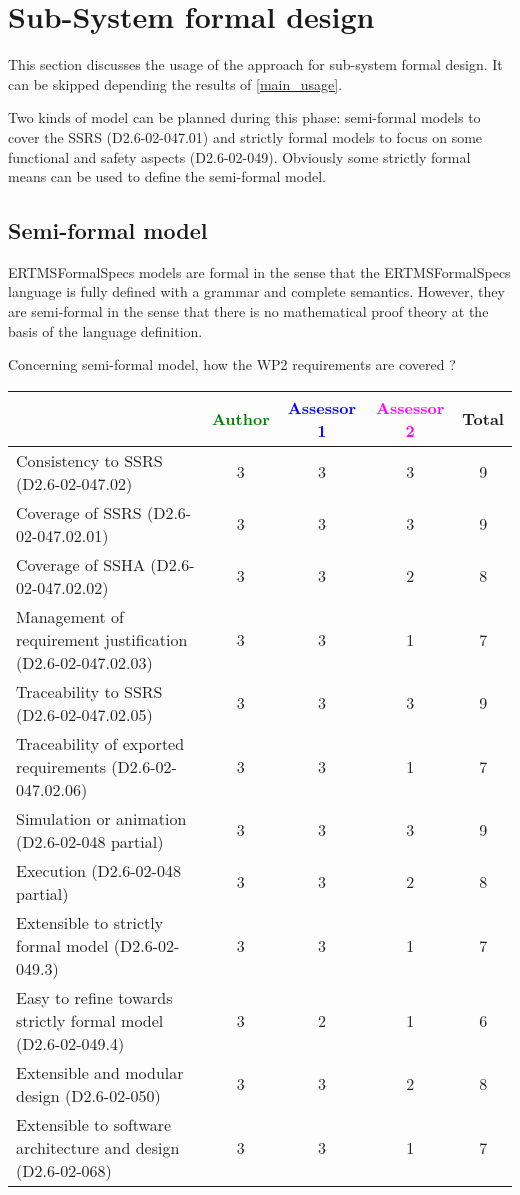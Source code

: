 \section{Sub-System formal design}
This section discusses the usage of the approach for sub-system formal design.
It can be skipped depending the results of \ref{main_usage}.

Two kinds of model can be planned during this phase: semi-formal models to  cover the SSRS (D2.6-02-047.01) and strictly formal  models to  focus on some functional and safety aspects (D2.6-02-049). Obviously some strictly  formal means can be used to define the semi-formal  model.

\subsection{Semi-formal model}

\begin{author_comment}
ERTMSFormalSpecs models are formal in the sense that the ERTMSFormalSpecs language is fully defined with a grammar and complete semantics. However, they are semi-formal in the sense that there is no mathematical proof theory at the basis of the language definition.  
\end{author_comment}

Concerning semi-formal model, how the WP2 requirements are covered ?

\begin{tabular}{|l | c | c | c | c|}
\hline
& \textcolor{green}{Author} & \textcolor{blue}{Assessor 1} & \textcolor{magenta}{Assessor 2} & Total \\
\hline 
Consistency to SSRS (D2.6-02-047.02) & 3 & 3 & 3 & 9 \\
\hline
Coverage of SSRS (D2.6-02-047.02.01)  & 3 & 3 & 3 & 9 \\
\hline
Coverage of SSHA (D2.6-02-047.02.02)  & 3 & 3 & 2 & 8  \\
\hline
Management of requirement justification (D2.6-02-047.02.03)  & 3 & 3 & 1 & 7  \\
\hline
Traceability to  SSRS (D2.6-02-047.02.05)  & 3 & 3 & 3 & 9  \\
\hline
Traceability of exported requirements (D2.6-02-047.02.06)  & 3 & 3 & 1 & 7  \\
\hline
Simulation or animation (D2.6-02-048 partial)  & 3 & 3 & 3 & 9  \\
\hline
Execution (D2.6-02-048 partial)  & 3 & 3 & 2 & 8  \\
\hline
Extensible to strictly formal model (D2.6-02-049.3) & 3 & 3 & 1 & 7 \\
\hline
Easy to refine towards strictly formal model (D2.6-02-049.4) & 3 & 2 & 1 & 6  \\
\hline
Extensible and modular design (D2.6-02-050)  & 3 & 3 & 2 & 8  \\
\hline
Extensible to software architecture and design (D2.6-02-068)   & 3 & 3 & 1 & 7  \\
\hline
\end{tabular}


